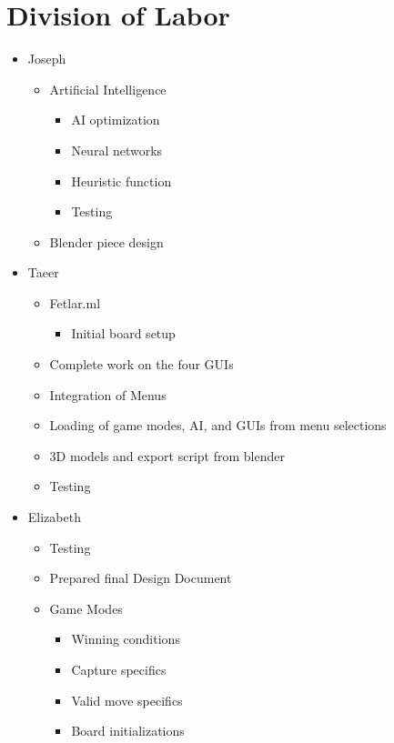 \documentclass[11pt, oneside]{article}
\begin{document}
\section{Division of Labor}
\begin{itemize}
\item Joseph
  \begin{itemize}
  \item Artificial Intelligence
    \begin{itemize}
    \item AI optimization
    \item Neural networks
    \item Heuristic function
    \item Testing
    \end{itemize}
  \item Blender piece design
  \end{itemize}
\item Taeer
  \begin{itemize}
  \item Fetlar.ml
    \begin{itemize}
    \item Initial board setup
    \end{itemize}
  \item Complete work on the four GUIs
  \item Integration of Menus
  \item Loading of game modes, AI, and GUIs from menu selections
  \item 3D models and export script from blender
  \item Testing
  \end{itemize}
\item Elizabeth
  \begin{itemize}
  \item Testing
  \item Prepared final Design Document
  \item Game Modes
    \begin{itemize}
    \item Winning conditions
    \item Capture specifics
    \item Valid move specifics
    \item Board initializations
    \end{itemize}
  \end{itemize}
\end{itemize}
\end{document}
